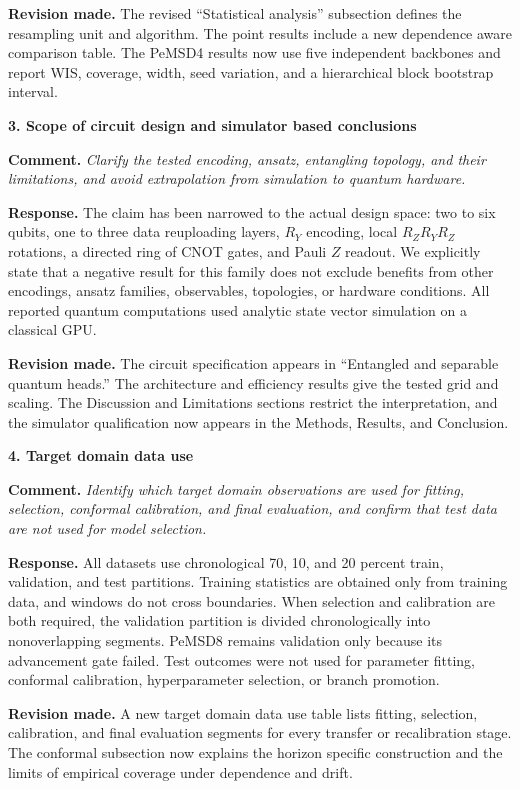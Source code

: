 \documentclass[11pt]{article}
\newcommand{\comment}[1]{\textbf{Comment.} \emph{#1}}
\newcommand{\response}[1]{\textbf{Response.} #1}
\newcommand{\change}[1]{\textbf{Revision made.} #1}
\begin{document}
\change{The revised ``Statistical analysis'' subsection defines the resampling unit and algorithm. The point results include a new dependence aware comparison table. The PeMSD4 results now use five independent backbones and report WIS, coverage, width, seed variation, and a hierarchical block bootstrap interval.}

\textbf{3. Scope of circuit design and simulator based conclusions}

\comment{Clarify the tested encoding, ansatz, entangling topology, and their limitations, and avoid extrapolation from simulation to quantum hardware.}

\response{The claim has been narrowed to the actual design space: two to six qubits, one to three data reuploading layers, $R_Y$ encoding, local $R_ZR_YR_Z$ rotations, a directed ring of CNOT gates, and Pauli $Z$ readout. We explicitly state that a negative result for this family does not exclude benefits from other encodings, ansatz families, observables, topologies, or hardware conditions. All reported quantum computations used analytic state vector simulation on a classical GPU.}

\change{The circuit specification appears in ``Entangled and separable quantum heads.'' The architecture and efficiency results give the tested grid and scaling. The Discussion and Limitations sections restrict the interpretation, and the simulator qualification now appears in the Methods, Results, and Conclusion.}

\textbf{4. Target domain data use}

\comment{Identify which target domain observations are used for fitting, selection, conformal calibration, and final evaluation, and confirm that test data are not used for model selection.}

\response{All datasets use chronological 70, 10, and 20 percent train, validation, and test partitions. Training statistics are obtained only from training data, and windows do not cross boundaries. When selection and calibration are both required, the validation partition is divided chronologically into nonoverlapping segments. PeMSD8 remains validation only because its advancement gate failed. Test outcomes were not used for parameter fitting, conformal calibration, hyperparameter selection, or branch promotion.}

\change{A new target domain data use table lists fitting, selection, calibration, and final evaluation segments for every transfer or recalibration stage. The conformal subsection now explains the horizon specific construction and the limits of empirical coverage under dependence and drift.}
\end{document}
